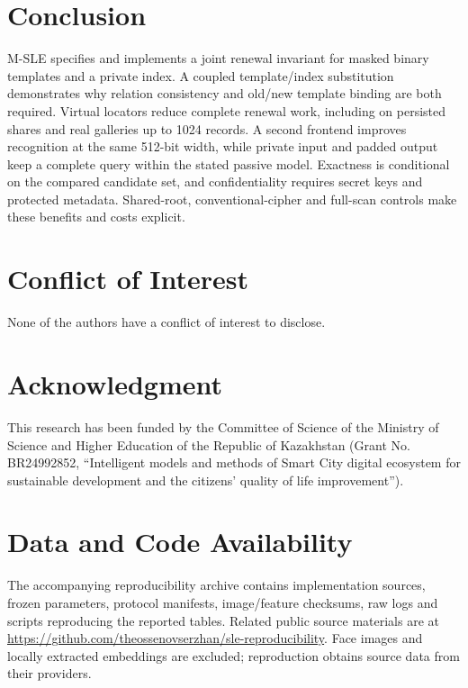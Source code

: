 \documentclass[journal]{IEEEtran}
\newcommand{\MSLE}{\textsc{M-SLE}\xspace}
\begin{document}
\section{Conclusion}\label{sec:conclusion}
\MSLE specifies and implements a joint renewal invariant for masked binary templates and a private index. A coupled template/index substitution demonstrates why relation consistency and old/new template binding are both required. Virtual locators reduce complete renewal work, including on persisted shares and real galleries up to 1024 records. A second frontend improves recognition at the same 512-bit width, while private input and padded output keep a complete query within the stated passive model. Exactness is conditional on the compared candidate set, and confidentiality requires secret keys and protected metadata. Shared-root, conventional-cipher and full-scan controls make these benefits and costs explicit.

\section*{Conflict of Interest}
None of the authors have a conflict of interest to disclose.

\section*{Acknowledgment}
This research has been funded by the Committee of Science of the Ministry of Science and Higher Education of the Republic of Kazakhstan (Grant No. BR24992852, ``Intelligent models and methods of Smart City digital ecosystem for sustainable development and the citizens' quality of life improvement'').
\section*{Data and Code Availability}
The accompanying reproducibility archive contains implementation sources, frozen parameters, protocol manifests, image/feature checksums, raw logs and scripts reproducing the reported tables. Related public source materials are at \url{https://github.com/theossenovserzhan/sle-reproducibility}. Face images and locally extracted embeddings are excluded; reproduction obtains source data from their providers.


\end{document}
